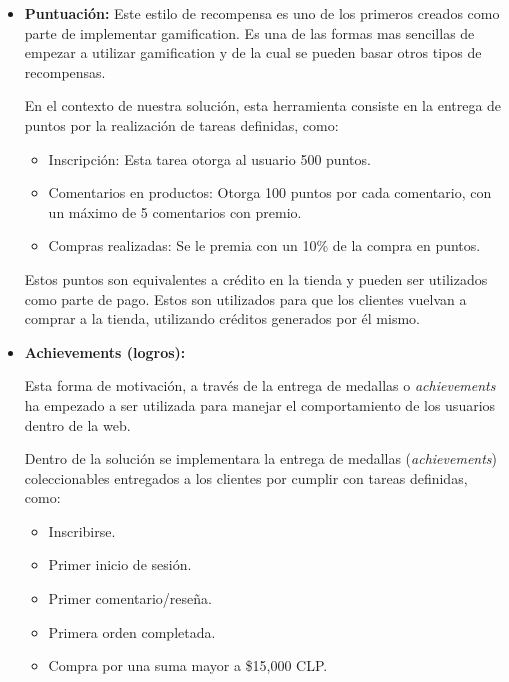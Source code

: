 \begin{itemize}
    \item {\bf Puntuación:}
	Este estilo de recompensa es uno de los primeros creados como parte de
	implementar gamification. Es una de las formas mas sencillas de empezar
 	a utilizar gamification\cite{OnlineComp} y de la cual se pueden basar otros tipos de recompensas.

        En el contexto de nuestra solución, esta herramienta consiste en la entrega de
	puntos por la realización de tareas definidas, como:

    \begin{itemize}
        \item Inscripción:
            Esta tarea otorga al usuario 500 puntos.
        \item Comentarios en productos:
            Otorga 100 puntos por cada comentario, con un máximo de 5 comentarios
            con premio.
        \item Compras realizadas:
            Se le premia con un 10\% de la compra en puntos.
    \end{itemize}

        Estos puntos son equivalentes a crédito en la tienda y pueden ser
        utilizados como parte de pago.
        Estos son utilizados para que los clientes vuelvan a comprar a la tienda,
        utilizando créditos generados por él mismo.


    \item {\bf Achievements (logros):}

	Esta forma de motivación, a través de la entrega de medallas o \emph{achievements}
	ha empezado a ser utilizada para manejar el comportamiento de los
	usuarios dentro de la web\cite{BehaviorBadges}.

        Dentro de la solución se implementara la entrega de medallas (\emph{achievements})
	coleccionables entregados a los clientes por cumplir con tareas definidas, como:

        \begin{itemize}
            \item Inscribirse.
            \item Primer inicio de sesión.
            \item Primer comentario/reseña.
            \item Primera orden completada.
            \item Compra por una suma mayor a \$15,000 CLP.
        \end{itemize}


\end{itemize}
